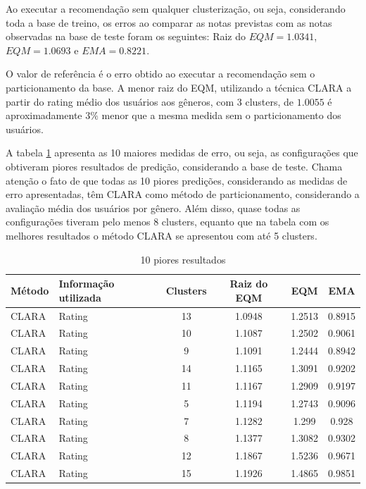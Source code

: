 \documentclass[12pt,a4paper,header]{abnt}
\begin{document}
Ao executar a recomendação sem qualquer clusterização, ou seja, considerando toda a base de treino, os erros ao comparar as notas previstas com as notas observadas na base de teste foram os seguintes: Raiz do $EQM = 1.0341$, $EQM = 1.0693$ e $EMA = 0.8221$.

O valor de referência é o erro obtido ao executar a recomendação sem o particionamento da base. A menor raiz do EQM, utilizando a técnica CLARA a partir do rating médio dos usuários aos gêneros, com 3 clusters, de $1.0055$ é aproximadamente $3\%$ menor que a mesma medida sem o particionamento dos usuários. 

A tabela \ref{tail10_erros_rec} apresenta as 10 maiores medidas de erro, ou seja, as configurações que obtiveram piores resultados de predição, considerando a base de teste. Chama atenção o fato de que todas as 10 piores predições, considerando as medidas de erro apresentadas, têm CLARA como método de particionamento, considerando a avaliação média dos usuários por gênero. Além disso, quase todas as configurações tiveram pelo menos 8 clusters, equanto que na tabela com os melhores resultados o método CLARA se apresentou com até 5 clusters.

\begin{longtable}{@{}llcccc@{}}
\caption{10 piores resultados}
\label{tail10_erros_rec}
\\
\toprule
\textbf{Método}   & \textbf{Informação utilizada}   & \textbf{Clusters}   & \textbf{Raiz do EQM}     & \textbf{EQM}             & \textbf{EMA}             \\* \midrule
\endhead
%
\bottomrule
\endfoot
%
\endlastfoot
%
CLARA    & Rating                 & 13         & 1.0948          & 1.2513          & 0.8915          \\
CLARA    & Rating                 & 10         & 1.1087          & 1.2502          & 0.9061          \\
CLARA    & Rating                 & 9          & 1.1091          & 1.2444          & 0.8942          \\
CLARA    & Rating                 & 14         & 1.1165          & 1.3091          & 0.9202          \\
CLARA    & Rating                 & 11         & 1.1167          & 1.2909          & 0.9197          \\
CLARA    & Rating                 & 5          & 1.1194          & 1.2743          & 0.9096          \\
CLARA    & Rating                 & 7          & 1.1282          & 1.299           & 0.928           \\
CLARA    & Rating                 & 8          & 1.1377          & 1.3082          & 0.9302          \\
CLARA    & Rating                 & 12         & 1.1867          & 1.5236          & 0.9671          \\
CLARA    & Rating                 & 15         & 1.1926          & 1.4865          & 0.9851          \\* \bottomrule
\end{longtable}
 
\end{document}
